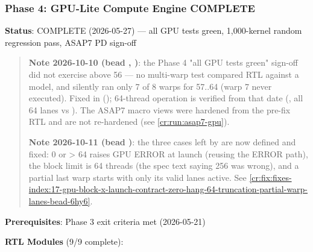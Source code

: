 \subsubsection{\texorpdfstring{Phase 4: GPU-Lite Compute Engine \ok{}
COMPLETE}{Phase 4: GPU-Lite Compute Engine  COMPLETE}}\label{cr:status:phase-status:phase-4-gpu-lite-compute-engine-white-check-mark-complete}

\begin{record}

\textbf{Status}: \ok{} COMPLETE (2026-05-27) --- all GPU tests green,
1,000-kernel random regression pass, ASAP7 PD sign-off

\begin{quote}
\textbf{Note 2026-10-10 (bead , )}: the Phase 4 "all
GPU tests green" sign-off did not exercise  above 56 ---
no multi-warp test compared RTL against a model, and 
silently ran only 7 of 8 warps for  57..64 (warp 7 never
executed). Fixed in  (); 64-thread
operation is verified from that date (, all
64 lanes vs ). The ASAP7  macro views
were hardened from the pre-fix RTL and are not re-hardened (see
\cref{cr:run:asap7-gpu}).

\textbf{Note 2026-10-11 (bead )}: the three 
cases left by  are now defined and fixed:  0 or
\textgreater{} 64 raises GPU ERROR at launch (reusing the 
ERROR path), the block limit is 64 threads (the spec text saying 256 was
wrong), and a partial last warp starts with only its valid lanes active.
See \cref{cr:fix:fixes-index:17-gpu-block-x-launch-contract-zero-hang-64-truncation-partial-warp-lanes-bead-6hy6}.
\end{quote}

\textbf{Prerequisites}: \ok{} Phase 3 exit criteria met (2026-05-21)

\textbf{RTL Modules} (9/9 complete):


\end{record}
